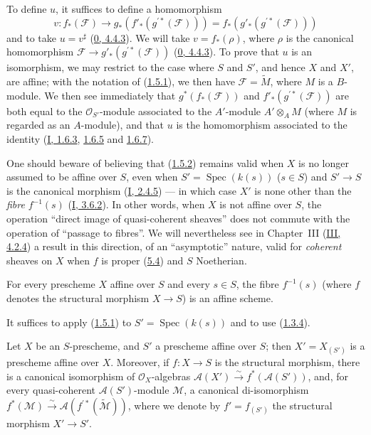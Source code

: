 To define $u$, it suffices to define a homomorphism
\[
  v:f_*(\mathcal{F})\longrightarrow
  g_*(f'_*(g^{\prime*}(\mathcal{F})))
  =f_*(g'_*(g^{\prime*}(\mathcal{F})))
\]
and to take $u=v^\sharp$ (\hyperref[0.4.4.3]{0, 4.4.3}). We will take
$v=f_*(\rho)$, where $\rho$ is the canonical homomorphism
$\mathcal{F}\to g'_*(g^{\prime*}(\mathcal{F}))$
(\hyperref[0.4.4.3]{0, 4.4.3}). To prove that $u$ is an isomorphism,
we may restrict to the case where $S$ and $S'$, and hence $X$ and $X'$, are
affine; with the notation of (\hyperref[II.1.5.1]{1.5.1}), we then have
$\mathcal{F}=\widetilde{M}$, where $M$ is a $B$-module. We then see
immediately that $g^*(f_*(\mathcal{F}))$ and
$f'_*(g^{\prime*}(\mathcal{F}))$ are both equal to the
$\mathcal{O}_{S'}$-module associated to the $A'$-module $A'\otimes_A M$
(where $M$ is regarded as an $A$-module), and that $u$ is the homomorphism
associated to the identity (\hyperref[I.1.6.3]{I, 1.6.3},
\hyperref[I.1.6.5]{1.6.5} and \hyperref[I.1.6.7]{1.6.7}).

\begin{remark}[1.5.3]
\label{II.1.5.3}
One should beware of believing that (\hyperref[II.1.5.2]{1.5.2}) remains
valid when $X$ is no longer assumed to be affine over $S$, even when
$S'=\operatorname{Spec}(k(s))$ ($s\in S$) and $S'\to S$ is the
canonical morphism (\hyperref[I.2.4.5]{I, 2.4.5}) --- in which case $X'$
is none other than the \emph{fibre} $f^{-1}(s)$
(\hyperref[I.3.6.2]{I, 3.6.2}). In other words, when $X$ is not affine
over $S$, the operation
``direct image of quasi-coherent sheaves'' does not commute with the
operation of ``passage to fibres''. We will nevertheless see in Chapter~III
(\hyperref[III.4.2.4]{III, 4.2.4}) a result in this direction, of an
``asymptotic'' nature, valid for \emph{coherent} sheaves on $X$ when
$f$ is proper (\hyperref[II.5.4]{5.4}) and $S$ Noetherian.
\end{remark}

\begin{corollary}[1.5.4]
\label{II.1.5.4}
For every prescheme $X$ affine over $S$ and every $s\in S$, the fibre
$f^{-1}(s)$ (where $f$ denotes the structural morphism $X\to S$) is an
affine scheme.
\end{corollary}

It suffices to apply (\hyperref[II.1.5.1]{1.5.1}) to
$S'=\operatorname{Spec}(k(s))$ and to use
(\hyperref[II.1.3.4]{1.3.4}).

\begin{corollary}[1.5.5]
\label{II.1.5.5}
Let $X$ be an $S$-prescheme, and $S'$ a prescheme affine over $S$; then
$X'=X_{(S')}$ is a prescheme affine over $X$. Moreover, if
$f:X\to S$ is the structural morphism, there is a canonical isomorphism of
$\mathcal{O}_X$-algebras
$\mathcal{A}(X')\xrightarrow{\sim}f^*(\mathcal{A}(S'))$, and, for every
quasi-coherent $\mathcal{A}(S')$-module $\mathcal{M}$, a canonical
di-isomorphism
$f^*(\mathcal{M})\xrightarrow{\sim}
\mathcal{A}(f^{\prime*}(\widetilde{\mathcal{M}}))$, where we denote by
$f'=f_{(S')}$ the structural morphism $X'\to S'$.
\end{corollary}

